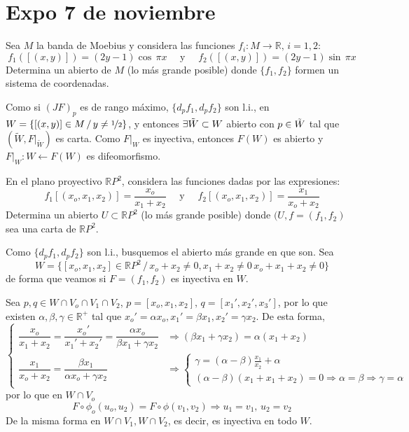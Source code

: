\section{Expo 7 de noviembre}
\begin{ejer}
    [1] Sea $M$ la banda de Moebius y considera las funciones $f_i:M \longrightarrow \mathbb R, \, i=1,2$:
    $$f_1\left([(x,y)]\right) = (2y-1) \cos \, \pi x\quad \text{ y } \quad f_2\left([(x,y)]\right) =(2y-1)\sin \, \pi x$$
Determina un abierto de $M$ (lo m\'as grande posible) donde $\{f_1, f_2\}$ formen un
sistema de coordenadas.
\end{ejer}
\begin{sol} Como si $(JF)_p$ es de rango m\'aximo, $\{d_pf_1, d_pf_2\}$ son l.i., en $W = \{[(x,y)] \in M \, / \, y \neq \nicefrac{1}{2}\}$, y entonces $\exists \Tilde{W} \subset W$ abierto con $p \in \Tilde{W}$ tal que $(\tilde{W}, F|_{\tilde{W}})$ es carta. Como $F|_W$ es inyectiva, entonces $F(W)$ es abierto y $F|_W:W \longleftarrow F(W)$ es difeomorfismo. 
\end{sol}
\begin{ejer}
    [2] En el plano proyectivo $\mathbb RP^2$, considera las funciones dadas por las expresiones:
 $$f_1[(x_o, x_1, x_2)] = \dfrac{x_o}{x_1 + x_2} \quad \text{ y } \quad f_2[(x_o, x_1, x_2)] = \dfrac{x_1}{x_o + x_2}$$
Determina un abierto $U \subset \mathbb RP^2$ (lo m\'as grande posible) donde $(U, f = (f_1, f_2)$ sea una carta de $\mathbb RP^2$.
\end{ejer}
\begin{sol}
    Como $\{d_pf_1, d_pf_2\}$ son l.i., busquemos el abierto m\'as grande en que son. Sea $$W=\{[x_o,x_1,x_2] \in \mathbb RP^2 \, / \,  x_o+x_2\neq0, x_1+x_2\neq 0\, x_o+x_1+x_2 \neq 0\}$$ 
    de forma que veamos si $F=(f_1,f_2)$ es inyectiva en $W$. 

    Sea $p, q \in W \cap V_o \cap V_1 \cap V_2$, $p=[x_o,x_1,x_2], \, q=[x_1',x_2',x_3']$, por lo que existen $\alpha, \beta, \gamma \in \mathbb R^+$ tal que $x_o'=\alpha x_o, x_1'=\beta x_1, x_2'=\gamma x_2$. De esta forma, 
    $$\begin{cases}
        \dfrac{x_o}{x_1+x_2}=\dfrac{x_o'}{x_1'+x_2'} = \dfrac{\alpha x_o}{\beta x_1+\gamma x_2} & \Rightarrow (\beta x_1 + \gamma x_2) = \alpha(x_1+x_2) \\ \dfrac{x_1}{x_o+x_2} = \dfrac{\beta x_1}{\alpha x_o + \gamma x_2} & \Rightarrow \begin{cases}
            \gamma=(\alpha- \beta)\frac{x_1}{x_2}+\alpha \\ (\alpha-\beta)(x_1+x_1+x_2)=0 \Rightarrow \alpha = \beta \Rightarrow \gamma=\alpha
        \end{cases}
    \end{cases}$$
    por lo que en $W \cap V_o$
    $$F\circ \phi_o (u_o,u_2) = F\circ \phi(v_1,v_2) \Rightarrow u_1=v_1, \, u_2=v_2$$
    De la misma forma en $W\cap V_1, W\cap V_2$, es decir, es inyectiva en todo $W$. 
\end{sol}
